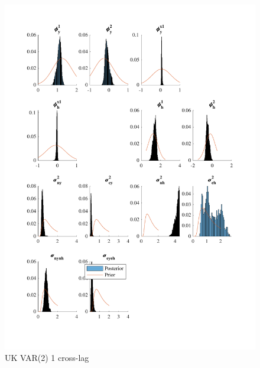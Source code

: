 \documentclass[
  12pt,
]{article}
\begin{document}
\begin{figure}

{\centering \includegraphics[width=0.85\linewidth]{../../Regression/Bayesian_UC_VAR2_nodrift_Crosscycle1lag/OutputData/posteriorpriordistribution_GB} 

}

\caption{UK VAR(2) 1 cross-lag}\label{fig:unnamed-chunk-10}
\end{figure}
\end{document}
